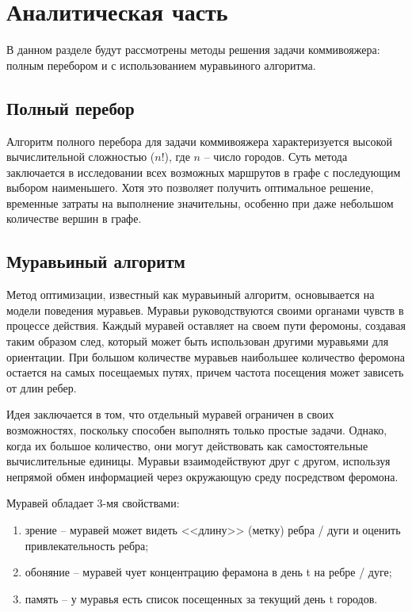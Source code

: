 \chapter{Аналитическая часть}

В данном разделе будут рассмотрены методы решения задачи коммивояжера: полным перебором и с использованием муравьиного алгоритма.

\section{Полный перебор}

Алгоритм полного перебора для задачи коммивояжера характеризуется высокой вычислительной сложностью ($n!$), где $n$ -- число городов. 
Суть метода заключается в исследовании всех возможных маршрутов в графе с последующим выбором наименьшего. \cite{bruteforce}
Хотя это позволяет получить оптимальное решение, временные затраты на выполнение значительны, особенно при даже небольшом количестве вершин в графе.

\section{Муравьиный алгоритм}

Метод оптимизации, известный как муравьиный алгоритм, основывается на модели поведения муравьев. 
Муравьи руководствуются своими органами чувств в процессе действия. 
Каждый муравей оставляет на своем пути феромоны, создавая таким образом след, который может быть использован другими муравьями для ориентации. 
При большом количестве муравьев наибольшее количество феромона остается на самых посещаемых путях, причем частота посещения может зависеть от длин ребер.

Идея заключается в том, что отдельный муравей ограничен в своих возможностях, поскольку способен выполнять только простые задачи. 
Однако, когда их большое количество, они могут действовать как самостоятельные вычислительные единицы. 
Муравьи взаимодействуют друг с другом, используя непрямой обмен информацией через окружающую среду посредством феромона.

Муравей обладает 3-мя свойствами:
\begin{enumerate}
    \item зрение -- муравей может видеть <<длину>> (метку) ребра / дуги и оценить привлекательность ребра;
    \item обоняние -- муравей чует концентрацию ферамона в день t на ребре / дуге;
    \item память -- у муравья есть список посещенных за текущий день t городов.
\end{enumerate}


